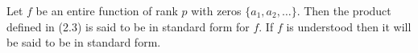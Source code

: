 Let $f$ be an entire function of rank $p$ with zeros $\{a_1, a_2, \ldots\}$. Then the product defined in (2.3) is said to be in standard form for $f$. If $f$ is understood then it will be said to be in standard form.